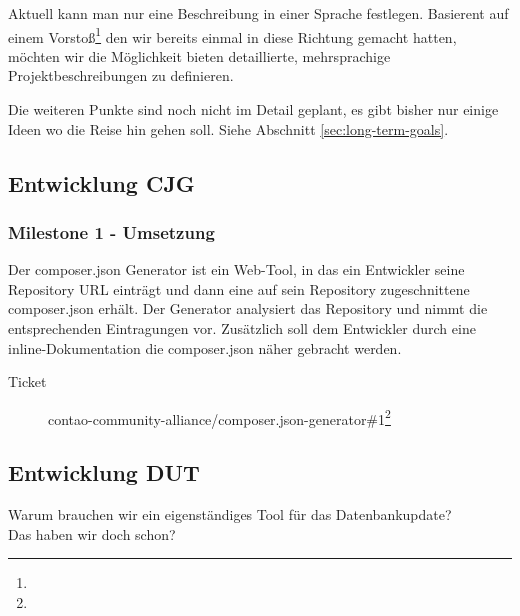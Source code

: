 \documentclass[
paper=a4,
draft=false,%
fontsize=10pt%
]{scrartcl}
\begin{document}
Aktuell kann man nur eine  Beschreibung in einer Sprache festlegen. Basierent auf einem Vorstoß\footnote{} den wir bereits einmal in diese Richtung gemacht hatten, möchten wir die Möglichkeit bieten detaillierte, mehrsprachige Projektbeschreibungen zu definieren.

\vspace{1cm}

\begin{info}
Die weiteren Punkte sind noch nicht im Detail geplant, es gibt bisher nur einige Ideen wo die Reise hin gehen soll. Siehe Abschnitt \ref{sec:long-term-goals}.
\end{info}

\pagebreak

\subsection{Entwicklung CJG}
\label{subsec:cjg}

\subsubsection{Milestone 1 - Umsetzung}
\label{subsec:cjg-milestone-1}

Der composer.json Generator ist ein Web-Tool, in das ein Entwickler seine Repository URL einträgt und dann eine auf sein Repository zugeschnittene composer.json erhält. Der Generator analysiert das Repository und nimmt die entsprechenden Eintragungen vor. Zusätzlich soll dem Entwickler durch eine inline-Dokumentation die composer.json näher gebracht werden.

\begin{description}
\item[Ticket] contao-community-alliance/composer.json-generator\#1\footnote{}
\end{description}

\subsection{Entwicklung DUT}
\label{subsec:dut}

\begin{emquotation}
Warum brauchen wir ein eigenständiges Tool für das Datenbankupdate? \\
\hspace*{\fill}Das haben wir doch schon?
\end{emquotation}
\end{document}
